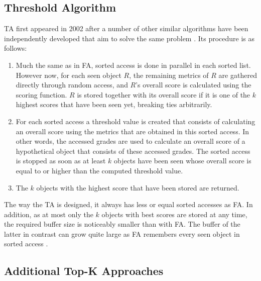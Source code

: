 \subsection{Threshold Algorithm}

TA first appeared in 2002 after a number of other similar algorithms have been independently developed that aim to solve the same problem \cite{fagin2002a}. Its procedure is as follows:

\begin{enumerate}

\item Much the same as in FA, sorted access is done in parallel in each sorted list. However now, for each seen object $R$, the remaining metrics of $R$ are gathered directly through random access, and $R$’s overall score is calculated using the scoring function. $R$ is stored together with its overall score if it is one of the $k$ highest scores that have been seen yet, breaking ties arbitrarily. 

\item For each sorted access a threshold value is created that consists of calculating an overall score using the metrics that are obtained in this sorted access. In other words, the accessed grades are used to calculate an overall score of a hypothetical object that consists of these accessed grades.  The sorted access is stopped as soon as at least $k$ objects have been seen whose overall score is equal to or higher than the computed threshold value. 

\item The $k$ objects with the highest score that have been stored are returned.

\end{enumerate}
 

 The way the TA is designed, it always has less or equal sorted accesses as FA. In addition, as at most only the $k$ objects with best scores are stored at any time, the required buffer size is noticeably smaller than with FA. The buffer of the latter in contrast can grow quite large as FA remembers every seen object in sorted access \cite{fagin2002}.



\subsection{Additional Top-K Approaches}

